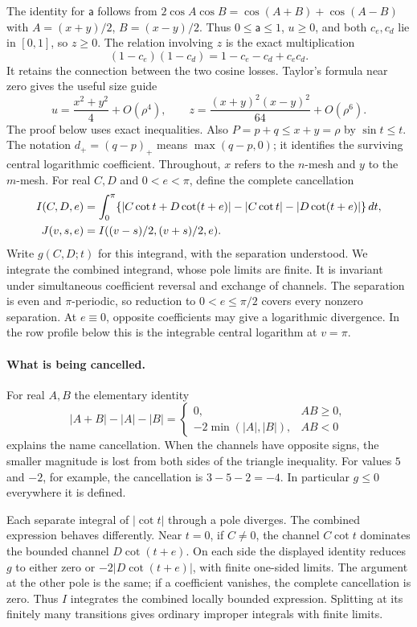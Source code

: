The identity for $\mathsf{a}$ follows from
$2\cos A\cos B=\cos(A+B)+\cos(A-B)$ with
$A=(x+y)/2$, $B=(x-y)/2$. Thus $0\leq \mathsf{a}\leq1$, $u\geq0$,
and both $c_e,c_d$ lie in $[0,1]$, so $z\geq0$. The relation involving
$z$ is the exact multiplication
\[
 (1-c_e)(1-c_d)=1-c_e-c_d+c_ec_d.
\]
It retains the connection between the two cosine losses. Taylor's
formula near zero gives the useful size guide
\[
 u=\frac{x^2+y^2}{4}+O(\rho^4),\qquad
 z=\frac{(x+y)^2(x-y)^2}{64}+O(\rho^6).
\]
The proof below uses exact inequalities.
Also $P=p+q\leq x+y=\rho$ by $\sin t\leq t$. The notation
$d_+=(q-p)_+$ means $\max(q-p,0)$; it identifies the surviving
central logarithmic coefficient.
Throughout, $x$ refers to the $n$-mesh and $y$ to the $m$-mesh.
For real $C,D$ and $0<e<\pi$, define the complete cancellation
\begin{align}\label{uc:cancellation}
 I(C,D,e)&=\int_0^\pi
 \{|C\cot t+D\cot(t+e)|-|C\cot t|-|D\cot(t+e)|\}\,dt,\notag\\
 J(v,s,e)&=I((v-s)/2,(v+s)/2,e).
\end{align}
Write $g(C,D;t)$ for this integrand, with the separation understood.
We integrate the combined integrand, whose pole limits are finite.
It is invariant under simultaneous coefficient reversal and exchange of
channels. The separation is even and $\pi$-periodic, so reduction to
$0<e\leq\pi/2$ covers every nonzero separation. At $e\equiv0$,
opposite coefficients may give a logarithmic divergence. In the row
profile below this is the integrable central logarithm at $v=\pi$.

\paragraph{What is being cancelled.}
For real $A,B$ the elementary identity
\[
 |A+B|-|A|-|B|=
 \begin{cases}0,&AB\geq0,\\-2\min(|A|,|B|),&AB<0\end{cases}
\]
explains the name cancellation. When the channels have opposite signs,
the smaller magnitude is lost from both sides of the triangle
inequality. For values $5$ and $-2$, for example, the cancellation is
$3-5-2=-4$. In particular $g\leq0$ everywhere it is defined.

Each separate integral of $|\cot t|$ through a pole diverges. The
combined expression behaves differently. Near $t=0$, if $C\ne0$, the
channel $C\cot t$ dominates the bounded channel $D\cot(t+e)$. On
each side the displayed identity reduces $g$ to either zero or
$-2|D\cot(t+e)|$, with finite one-sided limits. The argument at the
other pole is the same; if a coefficient vanishes, the complete
cancellation is zero. Thus $I$ integrates the combined locally bounded
expression. Splitting at its finitely many transitions gives ordinary
improper integrals with finite limits.

